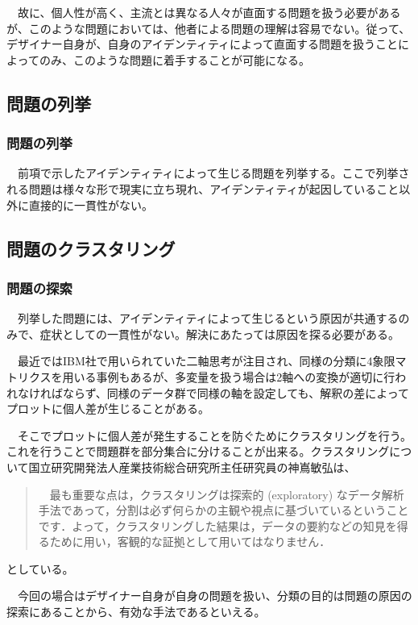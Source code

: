 \documentclass{jsarticle}
\begin{document}
　故に、個人性が高く、主流とは異なる人々が直面する問題を扱う必要があるが、このような問題においては、他者による問題の理解は容易でない。従って、デザイナー自身が、自身のアイデンティティによって直面する問題を扱うことによってのみ、このような問題に着手することが可能になる。

\newpage
\subsection{問題の列挙}

\subsubsection{問題の列挙}
　前項で示したアイデンティティによって生じる問題を列挙する。ここで列挙される問題は様々な形で現実に立ち現れ、アイデンティティが起因していること以外に直接的に一貫性がない。

\newpage
\subsection{問題のクラスタリング}

\subsubsection{問題の探索}
　列挙した問題には、アイデンティティによって生じるという原因が共通するのみで、症状としての一貫性がない。解決にあたっては原因を探る必要がある。

　最近ではIBM社で用いられていた二軸思考が注目され、同様の分類に4象限マトリクスを用いる事例もあるが、多変量を扱う場合は2軸への変換が適切に行われなければならず、同様のデータ群で同様の軸を設定しても、解釈の差によってプロットに個人差が生じることがある。

　そこでプロットに個人差が発生することを防ぐためにクラスタリングを行う。これを行うことで問題群を部分集合に分けることが出来る。クラスタリングについて国立研究開発法人産業技術総合研究所主任研究員の神嶌敏弘\cite{kamishima}は、

\begin{quotation}
　最も重要な点は，クラスタリングは探索的 (exploratory) なデータ解析手法であって，分割は必ず何らかの主観や視点に基づいているということです．よって，クラスタリングした結果は，データの要約などの知見を得るために用い，客観的な証拠として用いてはなりません．
\end{quotation}

としている。

　今回の場合はデザイナー自身が自身の問題を扱い、分類の目的は問題の原因の探索にあることから、有効な手法であるといえる。
　
\end{document}
